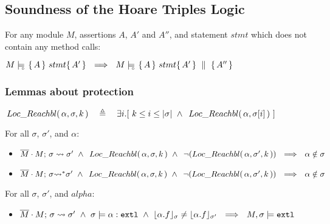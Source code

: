 \subsection{Soundness of the Hoare Triples Logic}
\label{s:sound:app:triples}

\begin{auxLemma}
\label{l:no:call}
For any module $M$, assertions $A$, $A'$ and $A''$, and statement $stmt$ which does not contain any method calls:
\begin{center}
$  \satisfiesD {M} {\triple {A} {stmt} {A'} }  \ \ \Longrightarrow\ \  \satisfiesD {M} {\quadruple {A} {stmt} {A'} {A''}}$
\end{center}
\end{auxLemma}




\subsubsection{Lemmas about protection}
\label{s:app:protect:lemmas}

\begin{definition}

$\LRelevantK {\alpha} {\sigma} {k}\ \ \ \triangleq\ \ \  \exists i.[ \ k \leq i \leq \depth \sigma \ \wedge \ \LRelevant {\alpha} {\RestictTo \sigma i}\ ]$
\end{definition}
 

{
\begin{lemma} For all $\sigma$, $\sigma'$, and $\alpha$:
\begin{itemize}
\item
$\leadstoBounded  {\Mtwo\cdot M}  {\sigma}  {\sigma'}\ \wedge \ \LRelevantK {\alpha} {\sigma} {k}\ \wedge\  \NotLRelevantK {\alpha} {\sigma'} {k} \ \ \Longrightarrow\ \ \alpha\notin\sigma$
\item
$\leadstoBoundedStar  {\Mtwo\cdot M}  {\sigma}  {\sigma'}\ \wedge \ \LRelevantK {\alpha} {\sigma} {k}\ \wedge \  \NotLRelevantK {\alpha} {\sigma'} {k} \ \  \Longrightarrow\ \ \alpha\notin\sigma$
\end{itemize}
\end{lemma}
 }
 
 {
 \begin{lemma} For all $\sigma$, $\sigma'$, and $alpha$:
\begin{itemize}
\item
$\leadstoBounded  {\Mtwo\cdot M}  {\sigma}  {\sigma'}\ \wedge \  \sigma \models \external{\alpha} \ \wedge\  {\interpret{\sigma} {\alpha.f}} \neq {\interpret{\sigma'} {\alpha.f}}
 \ \ \Longrightarrow\ \  M,\sigma \models \extThis$
\end{itemize}
\end{lemma}
  } 
    

